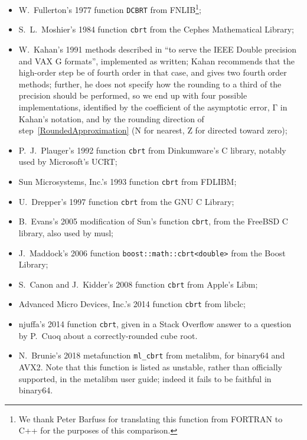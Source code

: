 ﻿\documentclass[10pt, a4paper, twoside]{basestyle}
\begin{document}
\begin{itemize}[nosep]
\item W.~Fullerton's 1977 function \cbstart{}\texttt{DCBRT}\cbend{} from FNLIB\footnote{We thank Peter Barfuss for translating this function from FORTRAN to
C++ for the purposes of this comparison.};
\item S.~L.~Moshier's 1984 function \cbstart{}\texttt{cbrt}\cbend{} from the Cephes Mathematical Library;
\item W.~Kahan's 1991 methods described in \cite[3]{KahanBindel2001} ``to serve the IEEE Double precision and VAX G formats'',
implemented as written; Kahan recommends that the high-order step be of fourth order in that case, and gives two fourth
order methods; further, he does not specify how the rounding to a third of the precision should be performed,
so we end up with four possible implementations, identified by the coefficient of the asymptotic error,
$\mathrm Γ$ in Kahan's notation, and by the rounding direction of step~\ref{RoundedApproximation}
($\mathrm{N}$ for nearest, \cbstart{}$\mathrm{Z}$ for directed toward zero);\cbend{}
\item  P.~J.~Plauger's 1992 function \cbstart{}\texttt{cbrt}\cbend{} from Dinkumware's C library, notably used by Microsoft's UCRT;
\item Sun Microsystems, Inc.'s 1993 function \cbstart{}\texttt{cbrt}\cbend{} from FDLIBM;
\item U.~Drepper's 1997 function \cbstart{}\texttt{cbrt}\cbend{} from the GNU C Library;
\item B.~Evans's 2005 modification of Sun's function \cbstart{}\texttt{cbrt}\cbend{}, from the FreeBSD C library, also used by musl;
\item J.~Maddock's 2006 function \cbstart{}\texttt{boost::math::cbrt<double>}\cbend{} from the Boost Library;
\item S.~Canon and J.~Kidder's 2008 function \cbstart{}\texttt{cbrt}\cbend{} from Apple's Libm;
\item Advanced Micro Devices, Inc.'s 2014 function \cbstart{}\texttt{cbrt}\cbend{} from libclc;
\item njuffa's 2014 function \cbstart{}\texttt{cbrt}\cbend{}, given in a Stack Overflow answer to a question by P.~Cuoq about a correctly-rounded cube root.
\item \cbstart{}N.~Brunie's 2018 metafunction \texttt{ml\_cbrt} from metalibm, for binary64 and AVX2. Note that this function is listed as
unstable, rather than officially supported, in the metalibm user guide; indeed it fails to be faithful in binary64.\cbend{}
\end{itemize}
\end{document}
